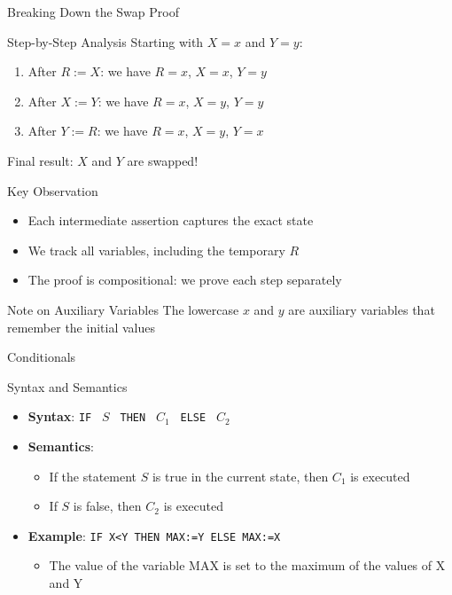 \begin{frame}{Breaking Down the Swap Proof}
    \begin{block}{Step-by-Step Analysis}
        Starting with $X=x$ and $Y=y$:
        \begin{enumerate}
            \item After $R:=X$: we have $R=x$, $X=x$, $Y=y$
            \item After $X:=Y$: we have $R=x$, $X=y$, $Y=y$ 
            \item After $Y:=R$: we have $R=x$, $X=y$, $Y=x$
        \end{enumerate}
        Final result: $X$ and $Y$ are swapped!
    \end{block}
    
    \begin{block}{Key Observation}
        \begin{itemize}
            \item Each intermediate assertion captures the exact state
            \item We track all variables, including the temporary $R$
            \item The proof is compositional: we prove each step separately
        \end{itemize}
    \end{block}
    
    \begin{alertblock}{Note on Auxiliary Variables}
        The lowercase $x$ and $y$ are auxiliary variables that remember the initial values
    \end{alertblock}
\end{frame}

\begin{frame}{Conditionals}
    \begin{block}{Syntax and Semantics}
        \begin{itemize}
            \item \textbf{Syntax}: \texttt{IF } $S$ \texttt{ THEN } $C_1$ \texttt{ ELSE } $C_2$
            \item \textbf{Semantics}:
            \begin{itemize}
                \item If the statement $S$ is true in the current state, then $C_1$ is executed
                \item If $S$ is false, then $C_2$ is executed
            \end{itemize}
            \item \textbf{Example}: \texttt{IF X<Y THEN MAX:=Y ELSE MAX:=X}
            \begin{itemize}
                \item The value of the variable MAX is set to the maximum of the values of X and Y
            \end{itemize}
        \end{itemize}
    \end{block}
\end{frame}

